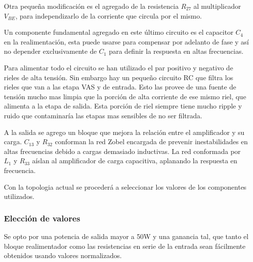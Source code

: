 Otra pequeña modificación es el agregado de la resistencia $R_{27}$ al multiplicador $V_{BE}$, para independizarlo de la corriente que circula por el mismo.

Un componente fundamental agregado en este último circuito es el capacitor $C_4$ en la realimentación, esta puede usarse para compensar por adelanto de fase y así no depender exclusivamente de $C_1$ para definir la respuesta en altas frecuencias.

Para alimentar todo el circuito se han utilizado el par positivo y negativo de rieles de alta tensión. Sin embargo hay un pequeño circuito RC que filtra los rieles que van a las etapa VAS y de entrada. Esto las provee de una fuente de tensión mucho mas limpia que la porción de alta corriente de ese mismo riel, que alimenta a la etapa de salida. Esta porción de riel siempre tiene mucho ripple y ruido que contaminaría las etapas mas sensibles de no ser filtrada.

A la salida se agrego un bloque que mejora la relación entre el amplificador y su carga. $C_{13}$ y $R_{32}$ conforman la red Zobel encargada de prevenir inestabilidades en altas frecuencias debido a cargas demasiado inductivas. La red conformada por $L_{1}$ y $R_{33}$ aíslan al amplificador de carga capacitiva, aplanando la respuesta en frecuencia.

Con la topologia actual se procederá a seleccionar los valores de los componentes utilizados. 
\medskip
\subsubsection{Elección de valores}

Se opto por una potencia de salida mayor a 50W y una ganancia tal, que tanto el bloque realimentador como las resistencias en serie de la entrada sean fácilmente obtenidos usando valores normalizados.



